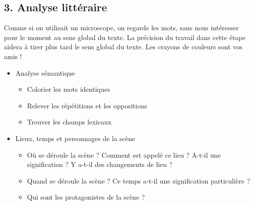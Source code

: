 \documentclass[12pt,a4paper,titlepage]{article}
\begin{document}
\subsection*{3. Analyse littéraire}
Comme si on utilisait un microscope, on regarde les mots, sans nous intéresser pour le moment au sens global du texte. La précision du travail dans cette étape aidera à tirer plus tard le sens global du texte. Les crayons de couleurs sont vos amis !
\begin{itemize}[label=]
\item Analyse sémantique
\begin{itemize}[label=]
\item Colorier les mots identiques
\item Relever les répétitions et les oppositions
\item Trouver les champs lexicaux
\end{itemize}
\item Lieux, temps et personnages de la scène
\begin{itemize}[label=]
\item Où se déroule la scène ? Comment est appelé ce lieu ? A-t-il une signification ? Y a-t-il des changements de lieu ?
\item Quand se déroule la scène ? Ce temps a-t-il une signification particulière ?
\item Qui sont les protagonistes de la scène ? 
\end{itemize}
\end{itemize}
\end{document}
